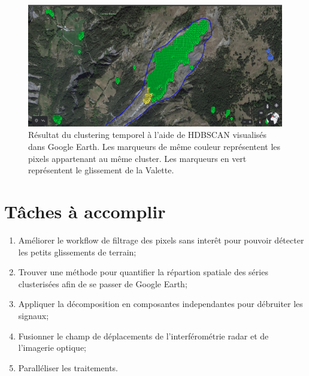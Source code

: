 \documentclass[11pt, openany]{report}
\begin{document}
\begin{figure}[H]
  \centering
  \includegraphics[width=0.6\linewidth]{first_landslide.png}
  \caption{Résultat du clustering temporel à l'aide de HDBSCAN visualisés dans Google Earth. Les marqueurs de même couleur représentent les pixels appartenant au même cluster. Les marqueurs en vert représentent le glissement de la Valette.}
\end{figure}

\section{Tâches à accomplir}
\begin{enumerate}
\item Améliorer le workflow de filtrage des pixels sans interêt pour pouvoir détecter les petits glissements de terrain;
\item Trouver une méthode pour quantifier la répartion spatiale des séries clusterisées afin de se passer de Google Earth;
\item Appliquer la décomposition en composantes independantes pour débruiter les signaux;
\item Fusionner le champ de déplacements de l'interférométrie radar et de l'imagerie optique;
\item Paralléliser les traitements.
\end{enumerate}
	
\end{document}
